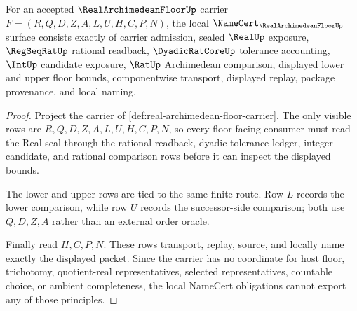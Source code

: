 \begin{theorem}
\label{thm:real-archimedean-floor-namecert-obligations}
For an accepted $\RealArchimedeanFloorUp$ carrier $F=(R,Q,D,Z,A,L,U,H,C,P,N)$, the local $\NameCert_{\RealArchimedeanFloorUp}$ surface consists exactly of carrier admission, sealed $\RealUp$ exposure, $\RegSeqRatUp$ rational readback, $\DyadicRatCoreUp$ tolerance accounting, $\IntUp$ candidate exposure, $\RatUp$ Archimedean comparison, displayed lower and upper floor bounds, componentwise transport, displayed replay, package provenance, and local naming.
\end{theorem}
\begin{proof}
Project the carrier of \autoref{def:real-archimedean-floor-carrier}. The only visible rows are $R,Q,D,Z,A,L,U,H,C,P,N$, so every floor-facing consumer must read the Real seal through the rational readback, dyadic tolerance ledger, integer candidate, and rational comparison rows before it can inspect the displayed bounds.

The lower and upper rows are tied to the same finite route. Row $L$ records the lower comparison, while row $U$ records the successor-side comparison; both use $Q,D,Z,A$ rather than an external order oracle.

Finally read $H,C,P,N$. These rows transport, replay, source, and locally name exactly the displayed packet. Since the carrier has no coordinate for host floor, trichotomy, quotient-real representatives, selected representatives, countable choice, or ambient completeness, the local NameCert obligations cannot export any of those principles.
\end{proof}


\begin{closurestatus}{\RealArchimedeanFloorUp}
  \theoryclosure{\seedClosure}
  \formalstatus{\unformalizedV}
\end{closurestatus}
